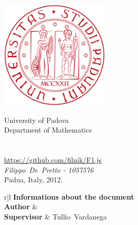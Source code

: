 \documentclass[a4paper,11pt]{article}
\def\ME				{\mbox{Filippo De Pretto}}
\def\SERIAL			{\mbox{1057576}}
\def\SUPERVISOR		{\mbox{Tullio Vardanega}}
\def\END			{Padua, Italy, 2012.}
\begin{document}
		
\thispagestyle{empty}

\begin{center}

\includegraphics[height=200px]{img/unipd_logo.png}

\vspace{0.5cm}
{\Huge University of Padova}\\[.5pc]
{\Large Department of Mathematics}\\[.5pc]
\vspace{5 mm}
{\Huge \textbf{\PROJECT{}}}\\[.5pc]
{\huge \SUBTITLE}\\[.4pc]
{\Large \url{https://github.com/filnik/F1.js}}\\[.5pc]
{\Large \emph{\ME{} - \SERIAL{}}}\\[1pc]


\vspace{0.5cm}
{\Large \END}\\[3pc]

\normalsize{
	\begin{tabular}{r|l}
		 {\textbf{Informations about the document}} \\
		\midrule
		\textbf{Author} 				& \AUTHOR \\
		\textbf{Supervisor} 			& \SUPERVISOR \\
	\end{tabular}
}

\end{center}

\newpage
\end{document}
